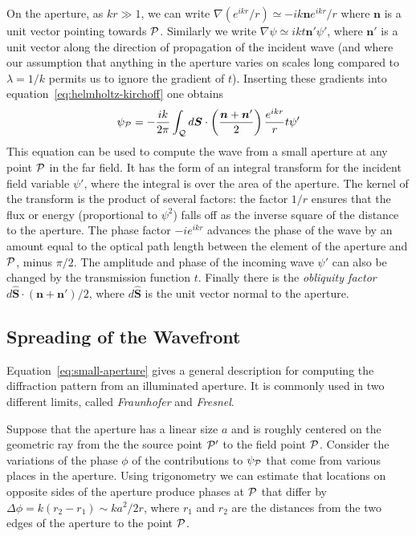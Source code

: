 \documentclass{article}
\newcommand{\be}{\begin{equation}}
\newcommand{\ee}{\end{equation}}
\def\cl#1{{\cal #1}}               %
\begin{document}
On the aperture, as $kr\gg 1$, we can write $\nabla({e^{ikr}/r})\simeq -{ik{\bm n}e^{ikr}/r}$ 
where ${\bm n}$ is a unit vector pointing towards $\cl{P}$. Similarly we write 
$\nabla\psi\simeq ikt{\bm n'}\psi'$, where ${\bm n'}$ is a unit vector along the direction
of propagation of the incident wave (and where our assumption that anything in the aperture
varies on scales long compared to $\lambda={1/k}$ permits us to ignore the gradient of $t$).
Inserting these gradients into equation~\ref{eq:helmholtz-kirchoff} one obtains
\be
\psi_\cl{P}=-{ik\over 2\pi}\int_\cl{Q}d{\bm S}\cdot\left({{\bm n}+{\bm n'}\over 2}\right){e^{ikr}\over r}t\psi'
\label{eq:small-aperture}
\ee
This equation can be used to compute the wave from a small aperture at any point $\cl{P}$ in 
the far field. It has the form of an integral transform for the incident field variable $\psi'$,
where the integral is over the area of the aperture. The kernel of the transform is the 
product of several factors: the factor ${1/r}$ ensures that the flux or energy (proportional
to $\psi^2$) falls off as the inverse square of the distance to the aperture. The phase 
factor $-ie^{ikr}$ advances the phase of the wave by an amount equal to the optical path 
length between the element of the aperture and $\cl{P}$, minus ${\pi/2}$. The amplitude and
phase of the incoming wave $\psi'$ can also be changed by the transmission function $t$.
Finally there is the {\it obliquity factor} ${d\hat{\bm S}\cdot({\bm n}+{\bm n'})/2}$, where 
$d\hat{\bm S}$ is the unit vector normal to the aperture. 

\subsection*{Spreading of the Wavefront}

Equation~\ref{eq:small-aperture} gives a general description for computing the diffraction 
pattern from an illuminated aperture. It is commonly used in two different limits, called
{\it Fraunhofer} and {\it Fresnel}.

Suppose that the aperture has a linear size $a$ and is roughly centered on the geometric ray
from the the source point $\cl{P}'$ to the field point $\cl{P}$. Consider the variations of 
the phase $\phi$ of the contributions to $\psi_\cl{P}$ that come from various places in the
aperture. Using trigonometry we can estimate that locations on opposite sides of the aperture
produce phases at $\cl{P}$ that differ by $\Delta\phi=k(r_2-r_1)\sim {ka^2/2r}$, where $r_1$ and
$r_2$ are the distances from the two edges of the aperture to the point $\cl{P}$. 
\end{document}

